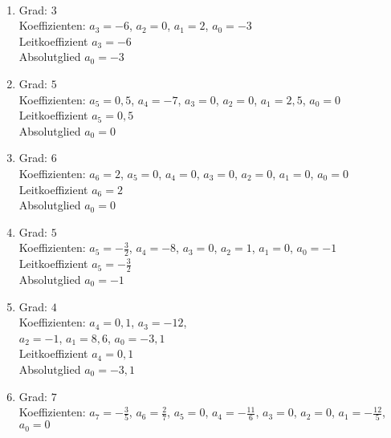 \begin{Answer}[ref=ganzHauptA1]\\
	\begin{minipage}{\textwidth}
		\begin{minipage}[t]{0.49\textwidth}
			\begin{enumerate}[label=\alph*)]
				\item Grad: \(3\)\\
				Koeffizienten: \(a_3=-6\), \(a_2=0\), \(a_1=2\), \(a_0=-3\)\\
				Leitkoeffizient \(a_3=-6\)\\
				Absolutglied \(a_0=-3\)
				\item Grad: \(5\)\\
				Koeffizienten: \(a_5=0,5\), \(a_4=-7\), \(a_3=0\), \(a_2=0\), \(a_1=2,5\), \(a_0=0\)\\
				Leitkoeffizient \(a_5=0,5\)\\
				Absolutglied \(a_0=0\)
				\item
				Grad: \(6\)\\
				Koeffizienten: \(a_6=2\), \(a_5=0\), \(a_4=0\), \(a_3=0\), \(a_2=0\), \(a_1=0\), \(a_0=0\)\\
				Leitkoeffizient \(a_6=2\)\\
				Absolutglied \(a_0=0\)
				\item Grad: \(5\)\\
				Koeffizienten: \(a_5=-\frac{3}{2}\), \(a_4=-8\), \(a_3=0\), \(a_2=1\), \(a_1=0\), \(a_0=-1\)\\
				Leitkoeffizient \(a_5=-\frac{3}{2}\)\\
				Absolutglied \(a_0=-1\)
			\end{enumerate}
		\end{minipage}
		\begin{minipage}[t]{0.49\textwidth}
			\begin{enumerate}[label=\alph*)]
				\setcounter{enumi}{4}
				\item Grad: \(4\)\\
				Koeffizienten: \(a_4=0,1\), \(a_3=-12\),\\
				\(a_2=-1\), \(a_1=8,6\), \(a_0=-3,1\)\\
				Leitkoeffizient \(a_4=0,1\)\\
				Absolutglied \(a_0=-3,1\)
				\item Grad: \(7\)\\
				Koeffizienten: \(a_7=-\frac{3}{5}\), \(a_6=\frac{2}{7}\), \(a_5=0\), \(a_4=-\frac{11}{6}\), \(a_3=0\), \(a_2=0\), \(a_1=-\frac{12}{5}\), \(a_0=0\)\\

\end{enumerate}
\end{minipage}
\end{minipage}
\end{Answer}
